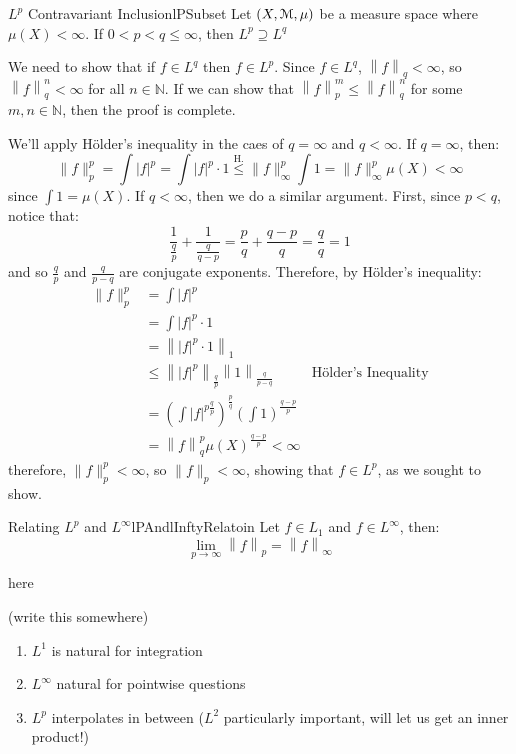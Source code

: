 \documentclass[oneside]{book}
\newcommand{\N}{\mathbb{N}}
\newcommand{\EM}{\EuScript{M}}
\newcommand{\rw}{\rightarrow}
\begin{document}
\begin{prop}{$L^p$ Contravariant Inclusion}{lPSubset}
	Let $(X, \EM, \mu)$ be a measure space where $\mu(X) < \infty$. If $0 < p < q \le \infty$, then $L^p \supseteq L^q$
\end{prop}

\begin{Proof}
	We need to show that if $f \in L^q$ then $f \in L^p$. Since $f \in L^q$, $\left\| f\right\|_q < \infty$, so
	$\left\|f\right\|_q^n < \infty$ for all $n \in \N$. If we can show that $\left\|f\right\|_p^m \le \left\|
	f\right\|_q^n$ for some $m,n \in \N$, then the proof is complete. 

	We'll apply H\"older's inequality in the caes of $q = \infty$ and $q < \infty$. If $q = \infty$, then:
	\[
		\|f\|_p^p = \int |f|^p = \int |f|^p\cdot 1 \overset{\text{H.}}{\le} \|f\|_\infty^p \int 1 = \|f\|_\infty^p\mu(X)
		< \infty
	\]
	since $\int 1 = \mu(X)$. If $q < \infty$, then we do a similar argument. First, since $p < q$, notice that:
	\[
		\frac{1}{\frac{q}{p}} + \frac{1}{\frac{q}{q-p}} = \frac{p}{q} + \frac{q-p}{q} = \frac{q}{q} = 1
	\]
	and so $\frac{q}{p}$ and $\frac{q}{p-q}$ are conjugate exponents. Therefore, by H\"older's inequality:
	\begin{align*}
		\|f\|_p^p &= \int |f|^p\\
				  &= \int |f|^p\cdot 1\\
				  &= \left\| |f|^p\cdot 1\right\|_1\\
				  &\le \left\| |f|^p\right\|_{\frac{q}{p}} \left\|1\right\|_{\frac{q}{p-q}}&\text{H\"older's Inequality}\\
				  &= \left(\int |f|^{p\frac{q}{p}}\right)^{\frac{p}{q}}\left(\int 1\right)^{\frac{q-p}{p}}\\
				  &=\left\|f\right\|_q^p\mu(X)^{\frac{q-p}{p}} < \infty
	\end{align*}
	therefore, $\|f\|_p^p < \infty$, so $\|f\|_p < \infty$, showing that $ f \in L^p$, as we sought to show. 
\end{Proof}

\begin{prop}{Relating $L^p$ and $L^\infty$}{lPAndlInftyRelatoin}
	Let $f \in L_1$ and $f \in L^\infty$, then:
	\[
		\lim_{p \rw \infty} \left\| f\right\|_p = \left\| f\right\|_\infty
	\]
\end{prop}

\begin{Proof}
	here
\end{Proof}

(write this somewhere)

\begin{enumerate}
	\item $L^1$ is natural for integration
	\item $L^\infty$ natural for pointwise questions
	\item $L^p$ interpolates in between ($L^2$ particularly important, will let us get an inner product!)
\end{enumerate}
\end{document}
